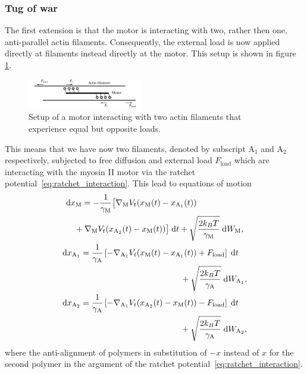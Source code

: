 \documentclass[aps,pre,twocolumn,showpacs,showkeys,superscriptaddress,floatfix]{revtex4-1}
\newcommand{\rmd}{{\mathrm d}}
\begin{document}
\subsubsection{Tug of war}
\label{sec:load_on_fil}
The first extension is that the motor is interacting with two, rather then one, anti-parallel actin filaments. 
Consequently, the external load is now applied directly at filaments instead directly at the motor.
This setup is shown in figure \ref{fig:tug_F_illustration}. 
\begin{figure}[t]
\centering
\includegraphics[width=0.45\textwidth,height=!]{tug_F_illustration}
\caption{
\label{fig:tug_F_illustration}
Setup of a motor interacting with two actin filaments that experience equal but opposite loads.
}
\end{figure}

This means that we have now two filaments, denoted by subscript ${\text{A}_1}$ and ${\text{A}_2}$ respectively,
subjected to free diffusion and external load $F_\text{load}$
which are interacting with the myosin II motor via the ratchet potential~\eqref{eq:ratchet_interaction}. 
This lead to equations of motion 
\begin{equation}
\begin{gathered}
\begin{multlined}[b][.45\textwidth]
\rmd x_\text{M} = 
- \frac{1}{\gamma_\text{M}} \bigl[ \nabla_\text{M} V_t(x_\text{M}(t) - x_{\text{A}_1}(t)) 
\\
+ \nabla_\text{M} V_t(x_{\text{A}_2}(t) - x_\text{M}(t)) \bigr] \; \rmd t 
+ \sqrt{ \frac{2 k_B T}{\gamma_\text{M}} } \; \rmd W_\text{M} ,
\end{multlined}\\
\begin{multlined}[b][.45\textwidth]
\rmd x_{\text{A}_1} = 
\frac{1}{\gamma_\text{A}} \left[ - \nabla_{\text{A}_1} V_t(x_\text{M}(t) - x_{\text{A}_1}(t)) + F_\text{load} \right] \; \rmd t 
\\
+ \sqrt{ \frac{2 k_B T}{\gamma_\text{A}} } \; \rmd W_{\text{A}_1} ,
\end{multlined}\\
\begin{multlined}[b][.45\textwidth]
\rmd x_{\text{A}_2} = 
\frac{1}{\gamma_\text{A}} \left[ - \nabla_{\text{A}_1} V_t(x_{\text{A}_2}(t) - x_\text{M}(t)) - F_\text{load} \right] \; \rmd t 
\\
+ \sqrt{ \frac{2 k_B T}{\gamma_\text{A}} } \; \rmd W_{\text{A}_2} ,
\end{multlined}
\end{gathered}
\label{eq:eom_two_actins}
\end{equation}
where the anti-alignment of polymers in substitution of $-x$ instead of $x$ for the second polymer in the argument of the ratchet potential~\eqref{eq:ratchet_interaction}.
\end{document}
